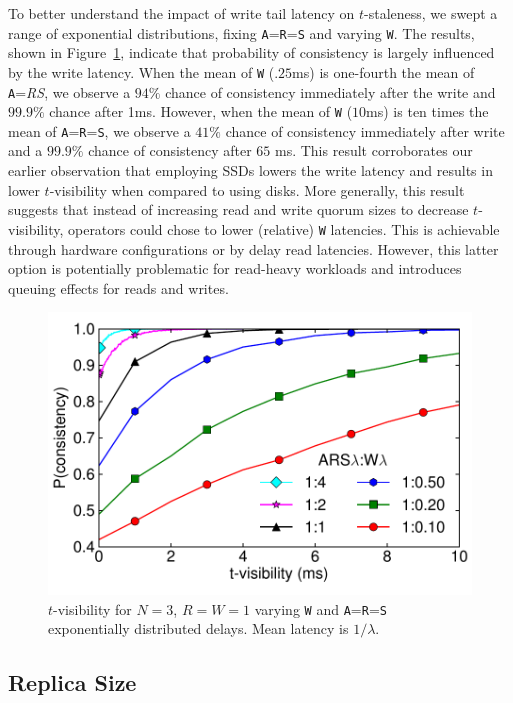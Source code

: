 \documentclass{vldb}
\begin{document}
To better understand the impact of write tail latency on
$t$-staleness, we swept a range of exponential distributions, fixing
\texttt{A}=\texttt{R}=\texttt{S} and varying \texttt{W}.  The results,
shown in Figure~\ref{fig:varydelay}, indicate that probability of
consistency is largely influenced by the write latency. When the mean
of \texttt{W} ($.25$ms) is one-fourth the mean of
\texttt{A}=\textit{R}\textit{S}, we observe a $94\%$ chance of
consistency immediately after the write and $99.9\%$ chance after 1ms.
However, when the mean of \texttt{W} ($10$ms) is ten times the mean of
\texttt{A}=\texttt{R}=\texttt{S}, we observe a $41\%$ chance of
consistency immediately after write and a $99.9\%$ chance of
consistency after $65$ ms. This result corroborates our earlier
observation that employing SSDs lowers the write latency and results
in lower $t$-visibility when compared to using disks.  More generally,
this result suggests that instead of increasing read and write quorum
sizes to decrease $t$-visibility, operators could chose to lower
(relative) \texttt{W} latencies.  This is achievable through hardware
configurations or by delay read latencies.  However, this latter
option is potentially problematic for read-heavy workloads and
introduces queuing effects for reads and writes.

\begin{figure}
\centering
\includegraphics[width=.85\columnwidth]{figs/rwratio.pdf}
\caption{$t$-visibility for $N$$=$$3$, $R$$=$$W$$=$$1$ varying \texttt{W} and \texttt{A}=\texttt{R}=\texttt{S} exponentially distributed delays.  Mean latency is $1/\lambda$.}
\label{fig:varydelay}
\end{figure}

\subsection{Replica Size}
\end{document}
